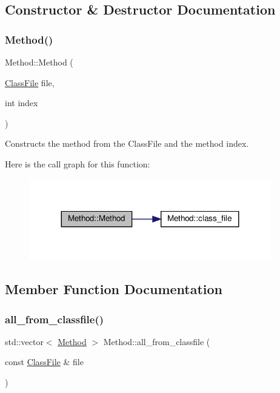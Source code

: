 \subsection{Constructor \& Destructor Documentation}
\mbox{\label{classMethod_aba8db898e71ab542920887eba94e6234}} 
\subsubsection{\texorpdfstring{Method()}{Method()}}
{\footnotesize\ttfamily Method\+::\+Method (\begin{DoxyParamCaption}\item[{\hyperlink{classfile_8h_a00b46b60bc40e813e9fb1bb049174346}{Class\+File}}]{file,  }\item[{int}]{index }\end{DoxyParamCaption})\hspace{0.3cm}{\ttfamily [private]}}



Constructs the method from the Class\+File and the method index. 

Here is the call graph for this function\+:\nopagebreak
\begin{figure}[H]
\begin{center}
\leavevmode
\includegraphics[width=299pt]{classMethod_aba8db898e71ab542920887eba94e6234_cgraph}
\end{center}
\end{figure}


\subsection{Member Function Documentation}
\mbox{\label{classMethod_a7b631e75e7438bb79c285b1bc6a712ab}} 
\subsubsection{\texorpdfstring{all\+\_\+from\+\_\+classfile()}{all\_from\_classfile()}}
{\footnotesize\ttfamily std\+::vector$<$ \hyperlink{classMethod}{Method} $>$ Method\+::all\+\_\+from\+\_\+classfile (\begin{DoxyParamCaption}\item[{const \hyperlink{classfile_8h_a00b46b60bc40e813e9fb1bb049174346}{Class\+File} \&}]{file }\end{DoxyParamCaption})\hspace{0.3cm}{\ttfamily [static]}}



